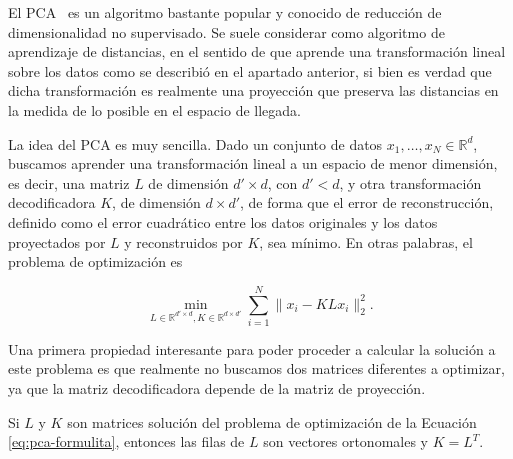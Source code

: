 El PCA~\parencite{pearson1901liii} es un algoritmo bastante popular y conocido de reducción de dimensionalidad no supervisado. Se suele considerar como algoritmo de aprendizaje de distancias, en el sentido de que aprende una transformación lineal sobre los datos como se describió en el apartado anterior, si bien es verdad que dicha transformación es realmente una proyección que preserva las distancias en la medida de lo posible en el espacio de llegada.

La idea del PCA es muy sencilla. Dado un conjunto de datos $x_1,\dots, x_N \in \mathbb{R}^d$, buscamos aprender una transformación lineal a un espacio de menor dimensión, es decir, una matriz $L$ de dimensión $d' \times d$, con $d' < d$, y otra transformación decodificadora $K$, de dimensión $d \times d'$, de forma que el error de reconstrucción, definido como el error cuadrático entre los datos originales y los datos proyectados por $L$ y reconstruidos por $K$, sea mínimo. En otras palabras, el problema de optimización es

\begin{equation}\label{eq:pca-formulita}
 \min_{L \in \mathbb{R}^{d'\times d}, K \in \mathbb{R}^{d \times d'}} \sum_{i=1}^N \|x_i - KLx_i \|_2^2.  \tag{5.3.1}
\end{equation}


Una primera propiedad interesante para poder proceder a calcular la solución a este problema es que realmente no buscamos dos matrices diferentes a optimizar, ya que la matriz decodificadora depende de la matriz de proyección.

\begin{proposicion}
    Si $L$ y $K$ son matrices solución del problema de optimización de la Ecuación \eqref{eq:pca-formulita}, entonces las filas de $L$ son vectores ortonomales y $K = L^T$.
\end{proposicion}

